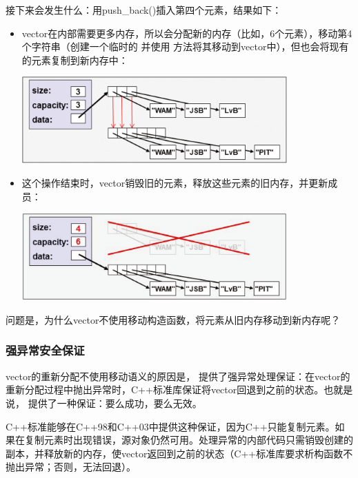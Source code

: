 接下来会发生什么：用push_back()插入第四个元素，结果如下：

\begin{itemize}
	\item vector在内部需要更多内存，所以会分配新的内存（比如，6个元素），移动第4个字符串（创建一个临时的  并使用  方法将其移动到vector中），但也会将现有的元素复制到新内存中：
\begin{center}
		\includegraphics[width=0.8\textwidth]{part1/ch7/images/2}
	\end{center}
	\item 这个操作结束时，vector销毁旧的元素，释放这些元素的旧内存，并更新成员：
\begin{center}
		\includegraphics[width=0.8\textwidth]{part1/ch7/images/3}
	\end{center}
\end{itemize}

问题是，为什么vector不使用移动构造函数，将元素从旧内存移动到新内存呢？

\subsubsection{强异常安全保证}

vector的重新分配不使用移动语义的原因是， 提供了强异常处理保证：在vector的重新分配过程中抛出异常时，C++标准库保证将vector回退到之前的状态。也就是说， 提供了一种保证：要么成功，要么无效。

C++标准能够在C++98和C++03中提供这种保证，因为C++只能复制元素。如果在复制元素时出现错误，源对象仍然可用。处理异常的内部代码只需销毁创建的副本，并释放新的内存，使vector返回到之前的状态（C++标准库要求析构函数不抛出异常；否则，无法回退）。

